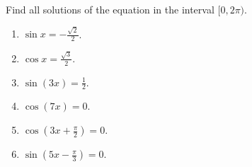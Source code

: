 Find all solutions of the equation in the interval $[0,2\pi)$.

\begin{enumerate}[ref={\fcProblemRef}]
\item $\sin x = -\frac{\sqrt{2}}{2}$.

\item $\cos x = \frac{\sqrt{3}}{2}$.

\item $\sin (3x) = \frac{1}{2}$.

\item $\cos (7x) = 0$.

\item $\cos \left(3x+\frac{\pi}{2}\right) = 0$.

\item $\sin \left(5x-\frac{\pi}{3}\right) = 0$.

\end{enumerate}